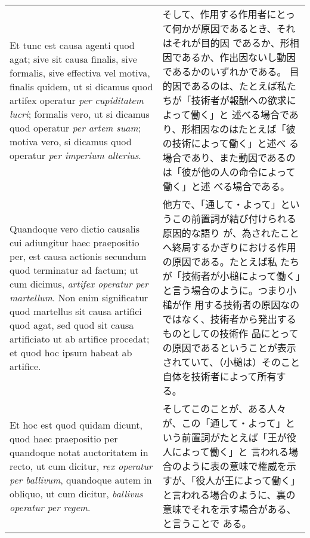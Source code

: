 \documentclass[10pt]{jsarticle} %
\begin{document}
\begin{longtable}{p{21em}p{21em}}
\\


Et
tunc est causa agenti quod agat; sive sit causa finalis, sive
formalis, sive effectiva vel motiva, finalis quidem, ut si dicamus
quod  artifex operatur {\itshape per cupiditatem lucri}; formalis vero, ut si
dicamus quod operatur {\itshape per artem suam}; motiva vero, si dicamus quod
operatur {\itshape per imperium alterius}. 

&

そして、作用する作用者にとって何かが原因であるとき、それはそれが目的因
 であるか、形相因であるか、作出因ないし動因であるかのいずれかである。
目的因であるのは、たとえば私たちが「技術者が報酬への欲求によって働く」と
 述べる場合であり、形相因なのはたとえば「彼の技術によって働く」と述べ
 る場合であり、また動因であるのは「彼が他の人の命令によって働く」と述
 べる場合である。

\\

Quandoque vero dictio causalis cui adiungitur haec praepositio per,
est causa actionis secundum quod terminatur ad factum; ut cum dicimus,
{\itshape artifex operatur per martellum}. Non enim significatur quod martellus
sit causa artifici quod agat, sed quod sit causa artificiato ut ab
artifice procedat; et quod hoc ipsum habeat ab artifice. 

&

他方で、「通して・よって」というこの前置詞が結び付けられる原因的な語り
 が、為されたことへ終局するかぎりにおける作用の原因である。たとえば私
 たちが「技術者が小槌によって働く」と言う場合のように。つまり小槌が作
 用する技術者の原因なのではなく、技術者から発出するものとしての技術作
 品にとっての原因であるということが表示されていて、（小槌は）そのこと
 自体を技術者によって所有する。


\\

Et hoc est
quod quidam dicunt, quod haec praepositio per quandoque notat
auctoritatem in recto, ut cum dicitur, {\itshape rex operatur per ballivum},
quandoque autem in obliquo, ut cum dicitur, {\itshape ballivus operatur per
regem}. 


&

そしてこのことが、ある人々が、この「通して・よって」という前置詞がたとえば「王が役人によって働く」と
 言われる場合のように表の意味で権威を示すが、「役人が王によって働く」
 と言われる場合のように、裏の意味でそれを示す場合がある、と言うことで
 ある。

\\


\end{longtable}
\end{document}
